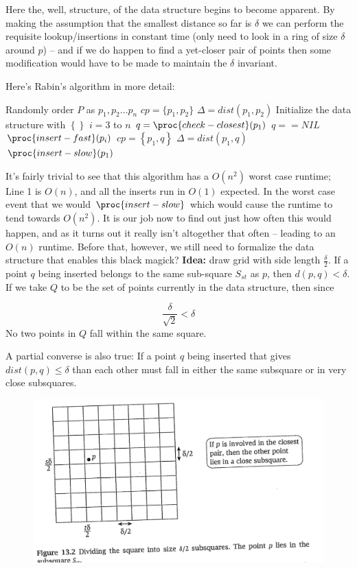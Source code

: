 \documentclass[../notes.tex]{subfiles}
\begin{document}
Here the, well, structure, of the data structure begins to become apparent.
By making the assumption that the smallest distance so far is $ \delta $ we can perform the requisite lookup/insertions in constant time (only need to look in a ring of size $ \delta $ around $ p $) -- and if we do happen to find a yet-closer pair of points then some modification would have to be made to maintain the $ \delta $ invariant.

Here's Rabin's algorithm in more detail:
\begin{codebox}
\li Randomly order $ P $ as $ p_1, p_2 \ldots p_n $
\li $ cp = \{p_1, p_2\} $
\li $\Delta = dist(p_1, p_2)$
\li Initialize the data structure with $ \left\{  \right\}  $
\li \For $ i = 3 $ to $ n $ \Do
\li    $ q = \proc{check-closest}(p_1) $
\li    \If $ q == NIL$ \Then
\li        $ \proc{insert-fast}(p_i) $
\li    \Else
\li        $ cp = \left\{ p_1, q \right\}  $
\li        $ \Delta = dist(p_1, q) $
\li        $ \proc{insert-slow}(p_1) $ \End \End
\end{codebox}

It's fairly trivial to see that this algorithm has a $ O(n^2) $ worst case runtime;
Line 1 is $ O(n) $, and all the inserts run in $ O(1) $ expected. In the worst case event that we would $ \proc{insert-slow} $ which would cause the runtime to tend towards $ O(n^2) $. 
It is our job now to find out just how often this would happen, and as it turns out it really isn't altogether that often -- leading to an $ O(n) $ runtime.
Before that, however, we still need to formalize the data structure that enables this black magick? \textbf{Idea: } draw grid with side length $ \frac{\delta}{2} $.
If a point $ q $ being inserted belongs to the same sub-square $ S_{st} $ as $ p $, then $ d(p, q) < \delta $. 
If we take $ Q $ to be the set of points currently in the data structure, then since

\begin{equation}
    \frac{\delta}{\sqrt{2} } < \delta
\end{equation}
No two points in $ Q $ fall within the same square.

A partial converse is also true: If a point $ q $ being inserted that gives $ dist(p, q) \le  \delta $ than each other must fall in either the same subsquare or in very close subsquares.


\begin{figure}[H]
\centering
\includegraphics[width=0.8\linewidth]{img/image_2023-01-20-12-40-20.png}
\end{figure}
\end{document}
